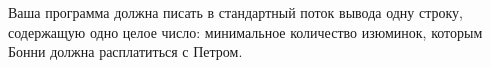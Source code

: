 Ваша программа должна писать в стандартный поток вывода одну строку, содержащую одно
целое число: минимальное количество изюминок, которым Бонни должна расплатиться с Петром.